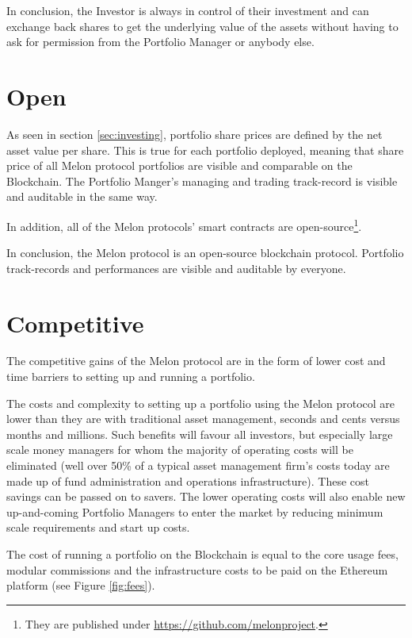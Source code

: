 \documentclass[9pt,oneside]{amsart}
\theoremstyle{plain}
\begin{document}
\begin{multicols}{2}
    In conclusion, the Investor is always in control of their investment and can exchange back shares to get the underlying value of the assets without having to ask for permission from the Portfolio Manager or anybody else.
    
    \section{Open}\label{sec:open}
    
    As seen in section \ref{sec:investing}, portfolio share prices are defined by the net asset value per share. This is true for each portfolio deployed, meaning that share price of all Melon protocol portfolios are visible and comparable on the Blockchain. The Portfolio Manger's managing and trading track-record is visible and auditable in the same way.
    
    In addition, all of the Melon protocols' smart contracts are open-source\footnote{They are published under \url{https://github.com/melonproject}.}. 
    
    In conclusion, the Melon protocol is an open-source blockchain protocol. Portfolio track-records and performances are visible and auditable by everyone.
    
    \section{Competitive}\label{sec:competitive}
    
    The competitive gains of the Melon protocol are in the form of lower cost and time barriers to setting up and running a portfolio.
    
    The costs and complexity to setting up a portfolio using the Melon protocol are lower than they are with traditional asset management, seconds and cents versus months and millions. Such benefits will favour all investors, but especially large scale money managers for whom the majority of operating costs will be eliminated (well over 50\% of a typical asset management firm’s costs today are made up of fund administration and operations infrastructure\cite{kpmg}). These cost savings can be passed on to savers. The lower operating costs will also enable new up-and-coming Portfolio Managers to enter the market by reducing minimum scale requirements and start up costs.
    
    The cost of running a portfolio on the Blockchain is equal to the core usage fees, modular commissions and the infrastructure costs to be paid on the Ethereum platform (see Figure \ref{fig:fees}). 
    

\end{multicols}
\end{document}
